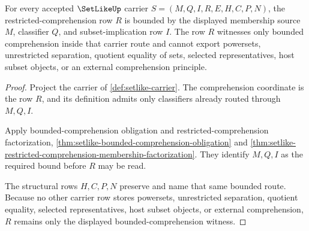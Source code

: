 \begin{theorem}
\label{thm:setlike-bounded-comprehension-witness}
For every accepted $\SetLikeUp$ carrier $S=(M,Q,I,R,E,H,C,P,N)$, the restricted-comprehension row $R$ is bounded by the displayed membership source $M$, classifier $Q$, and subset-implication row $I$. The row $R$ witnesses only bounded comprehension inside that carrier route and cannot export powersets, unrestricted separation, quotient equality of sets, selected representatives, host subset objects, or an external comprehension principle.
\end{theorem}
\begin{proof}
Project the carrier of \autoref{def:setlike-carrier}. The comprehension coordinate is the row $R$, and its definition admits only classifiers already routed through $M,Q,I$.

Apply bounded-comprehension obligation and restricted-comprehension factorization, \autoref{thm:setlike-bounded-comprehension-obligation} and \autoref{thm:setlike-restricted-comprehension-membership-factorization}. They identify $M,Q,I$ as the required bound before $R$ may be read.

The structural rows $H,C,P,N$ preserve and name that same bounded route. Because no other carrier row stores powersets, unrestricted separation, quotient equality, selected representatives, host subset objects, or external comprehension, $R$ remains only the displayed bounded-comprehension witness.
\end{proof}

